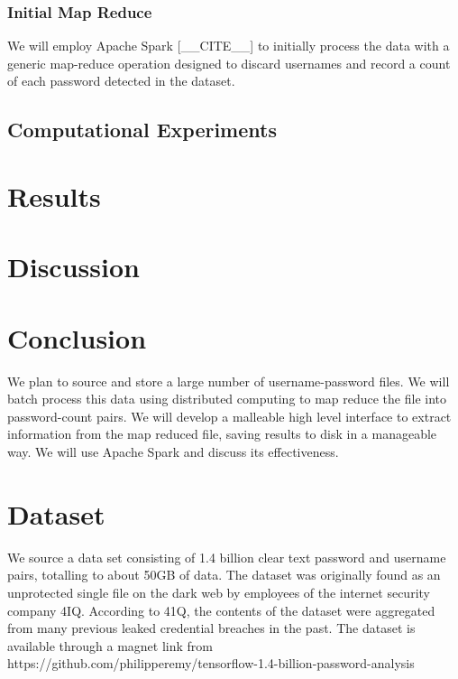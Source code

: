 \documentclass{article}
\begin{document}
\begin{multicols}{2}
\subsubsection*{Initial Map Reduce}
We will employ Apache Spark [\_\_CITE\_\_] to initially process the data with a generic map-reduce operation designed to discard usernames and record a count of each password detected in the dataset. 

\subsection*{\centering Computational Experiments}

\section*{\centering Results}

\section*{\centering Discussion}
\cite{kelley2012guess} \cite{weir2009password}

\section*{\centering Conclusion}

{\color{red}

We plan to source and store a large number of username-password files. We will batch process this data using distributed computing to map reduce the file into password-count pairs. We will develop a malleable high level interface to extract information from the map reduced file, saving results to disk in a manageable way.  We will use Apache Spark and discuss its effectiveness.

\section*{Dataset}
We source a data set consisting of 1.4 billion clear text password and username pairs, totalling to about 50GB of data. The dataset was originally found as an unprotected single file on the dark web by employees of the internet security company 4IQ. According to 41Q, the contents of the dataset were aggregated from many previous leaked credential breaches in the past. The dataset is available through a magnet link from https://github.com/philipperemy/tensorflow-1.4-billion-password-analysis

}
\end{multicols}
\end{document}

